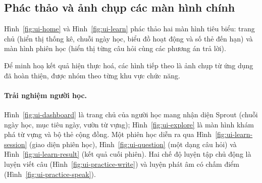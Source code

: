 \subsection{Phác thảo và ảnh chụp các màn hình chính}
\label{subsec:wireframe}

Hình~\ref{fig:ui-home} và Hình~\ref{fig:ui-learn} phác thảo hai màn hình
tiêu biểu: trang chủ (hiển thị thống kê, chuỗi ngày học, biểu đồ hoạt động
và số thẻ đến hạn) và màn hình phiên học (hiển thị từng câu hỏi cùng các
phương án trả lời).



Để minh hoạ kết quả hiện thực hoá, các hình tiếp theo là ảnh chụp từ ứng dụng
đã hoàn thiện, được nhóm theo từng khu vực chức năng.

\paragraph{Trải nghiệm người học.} Hình~\ref{fig:ui-dashboard} là trang chủ
của người học mang nhận diện Sprout (chuỗi ngày học, mục tiêu ngày, vườn từ
vựng); Hình~\ref{fig:ui-explore} là màn hình khám phá từ vựng và bộ thẻ cộng
đồng. Một phiên học diễn ra qua Hình~\ref{fig:ui-learn-session} (giao diện
phiên học), Hình~\ref{fig:ui-question} (một dạng câu hỏi) và
Hình~\ref{fig:ui-learn-result} (kết quả cuối phiên). Hai chế độ luyện tập chủ
động là luyện viết câu (Hình~\ref{fig:ui-practice-write}) và luyện phát âm có
chấm điểm (Hình~\ref{fig:ui-practice-speak}).








